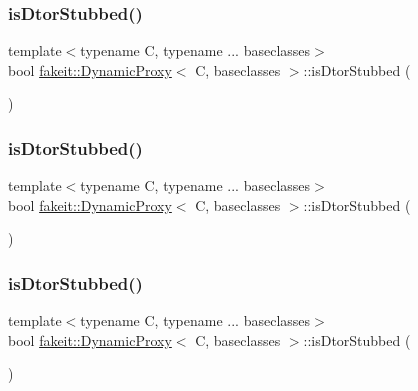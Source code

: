 \subsubsection{\texorpdfstring{isDtorStubbed()}{isDtorStubbed()}\hspace{0.1cm}{\footnotesize\ttfamily [4/9]}}
{\footnotesize\ttfamily template$<$typename C, typename ... baseclasses$>$ \\
bool \mbox{\hyperlink{structfakeit_1_1DynamicProxy}{fakeit\+::\+Dynamic\+Proxy}}$<$ C, baseclasses $>$\+::is\+Dtor\+Stubbed (\begin{DoxyParamCaption}{ }\end{DoxyParamCaption})\hspace{0.3cm}{\ttfamily [inline]}}

\mbox{\label{structfakeit_1_1DynamicProxy_a6d3f0dfa93dc98b37fb50002bc4ea2bc}} 
\subsubsection{\texorpdfstring{isDtorStubbed()}{isDtorStubbed()}\hspace{0.1cm}{\footnotesize\ttfamily [5/9]}}
{\footnotesize\ttfamily template$<$typename C, typename ... baseclasses$>$ \\
bool \mbox{\hyperlink{structfakeit_1_1DynamicProxy}{fakeit\+::\+Dynamic\+Proxy}}$<$ C, baseclasses $>$\+::is\+Dtor\+Stubbed (\begin{DoxyParamCaption}{ }\end{DoxyParamCaption})\hspace{0.3cm}{\ttfamily [inline]}}

\mbox{\label{structfakeit_1_1DynamicProxy_a6d3f0dfa93dc98b37fb50002bc4ea2bc}} 
\subsubsection{\texorpdfstring{isDtorStubbed()}{isDtorStubbed()}\hspace{0.1cm}{\footnotesize\ttfamily [6/9]}}
{\footnotesize\ttfamily template$<$typename C, typename ... baseclasses$>$ \\
bool \mbox{\hyperlink{structfakeit_1_1DynamicProxy}{fakeit\+::\+Dynamic\+Proxy}}$<$ C, baseclasses $>$\+::is\+Dtor\+Stubbed (\begin{DoxyParamCaption}{ }\end{DoxyParamCaption})\hspace{0.3cm}{\ttfamily [inline]}}

